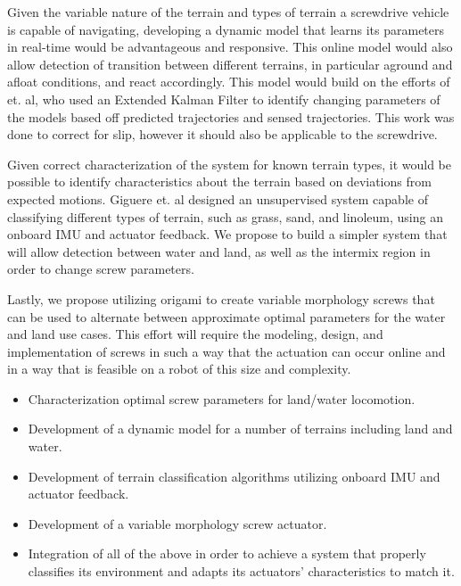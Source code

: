 Given the variable nature of the terrain and types of terrain a screwdrive vehicle is capable of navigating, developing a dynamic model that learns its parameters in real-time would be advantageous and responsive. This online model would also allow detection of transition between different terrains, in particular aground and afloat conditions, and react accordingly. This model would build on the efforts of \cite{Rogers-Marcovitz2014} et. al, who used an Extended Kalman Filter to identify changing parameters of the models based off predicted trajectories and sensed trajectories. This work was done to correct for slip, however it should also be applicable to the screwdrive. 


Given correct characterization of the system for known terrain types, it would be possible to identify characteristics about the terrain based on deviations from expected motions. Giguere et. al \cite{Giguere2010} designed an unsupervised system capable of classifying different types of terrain, such as grass, sand, and linoleum, using an onboard IMU and actuator feedback. We propose to build a simpler system that will allow detection between water and land, as well as the intermix region in order to change screw parameters. 

Lastly, we propose utilizing origami to create variable morphology screws that can be used to alternate between approximate optimal parameters for the water and land use cases. This effort will require the modeling, design, and implementation of screws in such a way that the actuation can occur online and in a way that is feasible on a robot of this size and complexity. 

\begin{itemize}
	\item Characterization optimal screw parameters for land/water locomotion.
	\item Development of a dynamic model for a number of terrains including land and water.
  \item Development of terrain classification algorithms utilizing onboard IMU and actuator feedback. 
  \item Development of a variable morphology screw actuator. 
	\item Integration of all of the above in order to achieve a system that properly classifies its environment and adapts its actuators' characteristics to match it. 
\end{itemize}


